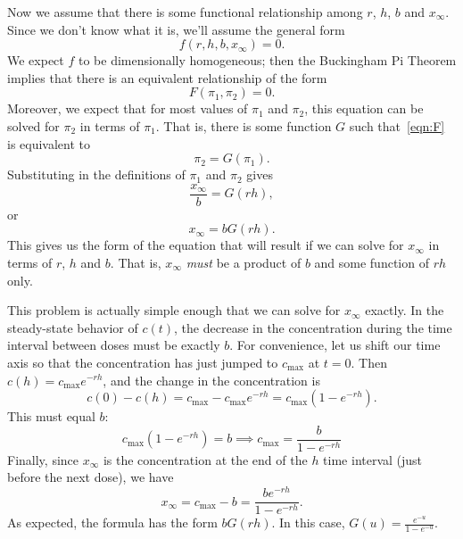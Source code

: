 Now we assume that there is some functional relationship
among $r$, $h$, $b$ and $x_{\infty}$.  Since we don't know
what it is, we'll assume the general form
\begin{equation}
  f(r,h,b,x_{\infty}) = 0.
\end{equation}
We expect $f$ to be dimensionally homogeneous; then the
Buckingham Pi Theorem implies that there is an equivalent
relationship of the form
\begin{equation}
   F(\pi_1, \pi_2) = 0.
\label{eqn:F}
\end{equation}
Moreover, we expect that for most values of $\pi_1$
and $\pi_2$, this equation can be solved for $\pi_2$
in terms of $\pi_1$. That is, there is some function
$G$ such that~\eqref{eqn:F} is equivalent to
\begin{equation}
   \pi_2 = G(\pi_1).
\end{equation}
Substituting in the definitions of $\pi_1$ and $\pi_2$ gives
\begin{equation}
   \frac{x_{\infty}}{b} = G(rh),
\end{equation}
or
\begin{equation}
   x_{\infty} = bG(rh).
\end{equation}
This gives us the form of the equation that will result if
we can solve for $x_{\infty}$ in terms of $r$, $h$ and $b$.
That is, $x_{\infty}$ \emph{must} be
a product of $b$ and some function of $rh$ only.

This problem is actually simple enough that we can
solve for $x_{\infty}$ exactly.
In the steady-state behavior of $c(t)$, the decrease
in the concentration during the time interval
between doses must be exactly $b$.
For convenience, let us shift our time axis
so that the concentration has just jumped to 
$c_{\textrm{max}}$ at $t=0$.
Then $c(h) = c_{\textrm{max}}e^{-rh}$, and the change in the
concentration is
\begin{equation}
   c(0)-c(h) = c_{\textrm{max}}-c_{\textrm{max}}e^{-rh} = c_{\textrm{max}}(1-e^{-rh}).
\end{equation}
This must equal $b$:
\begin{equation}
   c_{\textrm{max}}(1-e^{-rh})=b \implies
        c_{\textrm{max}} = \frac{b}{1-e^{-rh}} 
\end{equation}
Finally, since $x_{\infty}$ is the concentration at the
end of the $h$ time interval (just before the next dose),
we have
\begin{equation}
   x_{\infty} = c_{\textrm{max}}-b = \frac{b e^{-rh}}{1-e^{-rh}}.
\end{equation}
As expected, the formula has the form $bG(rh)$.
In this case, $G(u) = \frac{e^{-u}}{1-e^{-u}}$.
%
